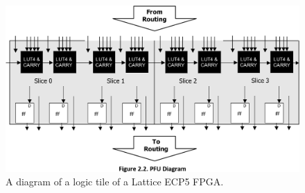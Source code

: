 \begin{figure}
\includegraphics[width=\textwidth]{sections/UseCase/image/slice-tile.png}
\caption[A diagram of a logic tile of a Lattice ECP5 FPGA.]{A diagram of a logic tile of a Lattice ECP5 FPGA{\footnotemark}.}
\label{fig:ecp5logiccell}
\end{figure}

